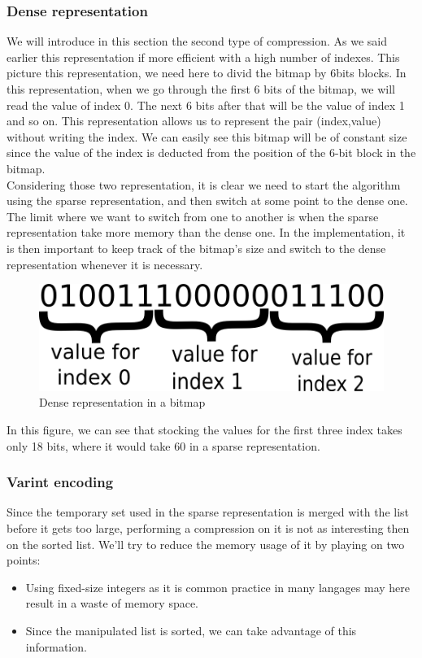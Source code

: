 \documentclass{article}
\begin{document}
\subsubsection{Dense representation}
We will introduce in this section the second type of compression. As
we said earlier this representation if more efficient with a high
number of indexes. This picture this representation, we need here to
divid the bitmap by 6bits blocks. In this representation, when we go
through the first 6 bits of the bitmap, we will read the value of
index 0. The next 6 bits after that will be the value of index 1 and
so on. This representation allows us to represent the pair
(index,value) without writing the index. We can easily see this bitmap
will be of constant size since the value of the index is deducted from
the position of the 6-bit block in the bitmap. \\ Considering those
two representation, it is clear we need to start the algorithm using
the sparse representation, and then switch at some point to the dense
one. The limit where we want to switch from one to another is when the
sparse representation take more memory than the dense one. In the
implementation, it is then important to keep track of the bitmap's
size and switch to the dense representation whenever it is necessary.

\begin{center}
\begin{figure}[h]
\includegraphics[scale=0.5]{dense.png}
\caption{Dense representation in a bitmap}
\end{figure}
\end{center}

In this figure, we can see that stocking the values for the first
three index takes only 18 bits, where it would take 60 in a sparse
representation.


\subsubsection{Varint encoding}
Since the temporary set used in the sparse representation is merged
with the list before it gets too large, performing a compression on it
is not as interesting then on the sorted list. We'll try to reduce the
memory usage of it by playing on two points:
\begin{itemize}
\item Using fixed-size integers as it is common practice in many
langages may here result in a waste of memory space.
\item Since the manipulated list is sorted, we can take advantage of
 this information.
 \end{itemize}
\end{document}
